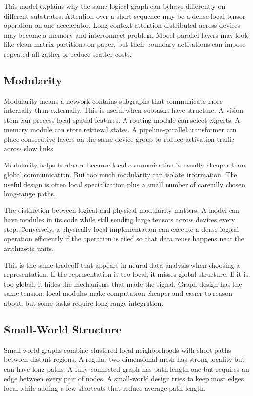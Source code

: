 This model explains why the same logical graph can behave differently on different substrates. Attention over a short sequence may be a dense local tensor operation on one accelerator. Long-context attention distributed across devices may become a memory and interconnect problem. Model-parallel layers may look like clean matrix partitions on paper, but their boundary activations can impose repeated all-gather or reduce-scatter costs.

\subsection{Modularity}

Modularity means a network contains subgraphs that communicate more internally than externally. This is useful when subtasks have structure. A vision stem can process local spatial features. A routing module can select experts. A memory module can store retrieval states. A pipeline-parallel transformer can place consecutive layers on the same device group to reduce activation traffic across slow links.

Modularity helps hardware because local communication is usually cheaper than global communication. But too much modularity can isolate information. The useful design is often local specialization plus a small number of carefully chosen long-range paths.

The distinction between logical and physical modularity matters. A model can have modules in its code while still sending large tensors across devices every step. Conversely, a physically local implementation can execute a dense logical operation efficiently if the operation is tiled so that data reuse happens near the arithmetic units.

This is the same tradeoff that appears in neural data analysis when choosing a representation. If the representation is too local, it misses global structure. If it is too global, it hides the mechanisms that made the signal. Graph design has the same tension: local modules make computation cheaper and easier to reason about, but some tasks require long-range integration.

\subsection{Small-World Structure}

Small-world graphs combine clustered local neighborhoods with short paths between distant regions. A regular two-dimensional mesh has strong locality but can have long paths. A fully connected graph has path length one but requires an edge between every pair of nodes. A small-world design tries to keep most edges local while adding a few shortcuts that reduce average path length.

